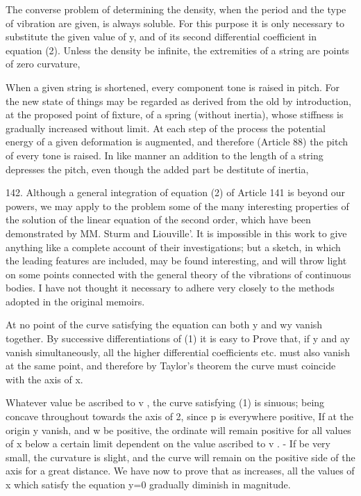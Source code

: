 The converse problem of determining the density, when the period and the
type of vibration are given, is always soluble. For this purpose it is
only necessary to substitute the given value of y, and of its second
differential coefficient in equation (2). Unless the density be
infinite, the extremities of a string are points of zero curvature,

When a given string is shortened, every component tone is raised in
pitch. For the new state of things may be regarded as derived from the
old by introduction, at the proposed point of fixture, of a spring
(without inertia), whose stiffness is gradually increased without limit.
At each step of the process the potential energy of a given deformation
is augmented, and therefore (Article 88) the pitch of every tone is
raised. In like manner an addition to the length of a string depresses
the pitch, even though the added part be destitute of inertia,

142. Although a general integration of equation (2) of Article 141 is
beyond our powers, we may apply to the problem some of the many
interesting properties of the solution of the linear equation of the
second order, which have been demonstrated by MM. Sturm and Liouville'.
It is impossible in this work to give anything like a complete account
of their investigations; but a sketch, in which the leading features are
included, may be found interesting, and will throw light on some points
connected with the general theory of the vibrations of continuous
bodies. I have not thought it necessary to adhere very closely to the
methods adopted in the original memoirs.

At no point of the curve satisfying the equation
can both y and wy vanish together. By successive differentiations
of (1) it is easy to Prove that, if y and ay vanish simultaneously,
all the higher differential coefficients etc. must also
vanish at the same point, and therefore by Taylor's theorem the curve
must coincide with the axis of x.

Whatever value be ascribed to v , the curve satisfying (1) is sinuous;
being concave throughout towards the axis of 2, since
p is everywhere positive, If at the origin y vanish, and w be positive,
the ordinate will remain positive for all values of x below a certain
limit dependent on the value ascribed to v . - If be very small, the
curvature is slight, and the curve will remain on the positive side of
the axis for a great distance. We have now to prove that as increases, all the
values of x which satisfy the equation y=0 gradually diminish in magnitude.

